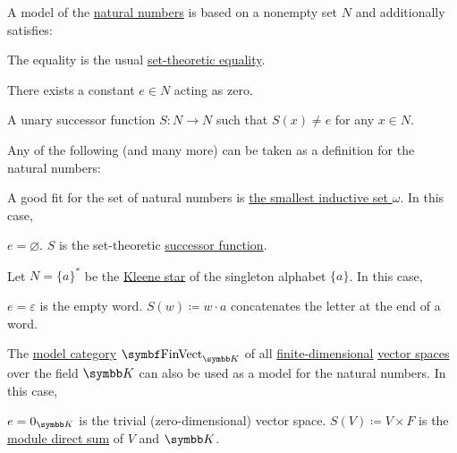 \begin{example}\label{ex:natural_numbers_models}
  A model of the \hyperref[def:natural_numbers]{natural numbers} is based on a nonempty set \( N \) and additionally satisfies:
  \begin{RefList}
     The equality is the usual \hyperref[def:set_zfc]{set-theoretic equality}.

     There exists a constant \( e \in N \) acting as zero.

     A unary successor function \( S: N \to N \) such that \( S(x) \neq e \) for any \( x \in N \).
  \end{RefList}

  Any of the following (and many more) can be taken as a definition for the natural numbers:
  \begin{DefEnum}
     A good fit for the set of natural numbers is \hyperref[def:smallest_inductive_set]{the smallest inductive set \( \omega \)}. In this case,
    \begin{RefList}
       \( e = \varnothing \).
       \( S \) is the set-theoretic \hyperref[def:successor_operator]{successor function}.
    \end{RefList}

     Let \( N = \{ a \}^{*} \) be the \hyperref[def:language]{Kleene star} of the singleton alphabet \( \{ a \} \). In this case,
    \begin{RefList}
       \( e = \varepsilon \) is the empty word.
       \( S(w) \coloneqq w \cdot a \) concatenates the letter at the end of a word.
    \end{RefList}

     The \hyperref[def:first_order_model_category]{model category} \( \Cat{FinVect}_{\BK} \) of all \hyperref[def:vector_space_dimension]{finite-dimensional} \hyperref[def:vector_space]{vector spaces} over the field \( \BK \) can also be used as a model for the natural numbers. In this case,
    \begin{RefList}
       \( e = 0_{\BK} \) is the trivial (zero-dimensional) vector space.
       \( S(V) \coloneqq V \times F \) is the \hyperref[def:left_module_direct_product]{module direct sum} of \( V \) and \( \BK \).
    \end{RefList}
  \end{DefEnum}
\end{example}

